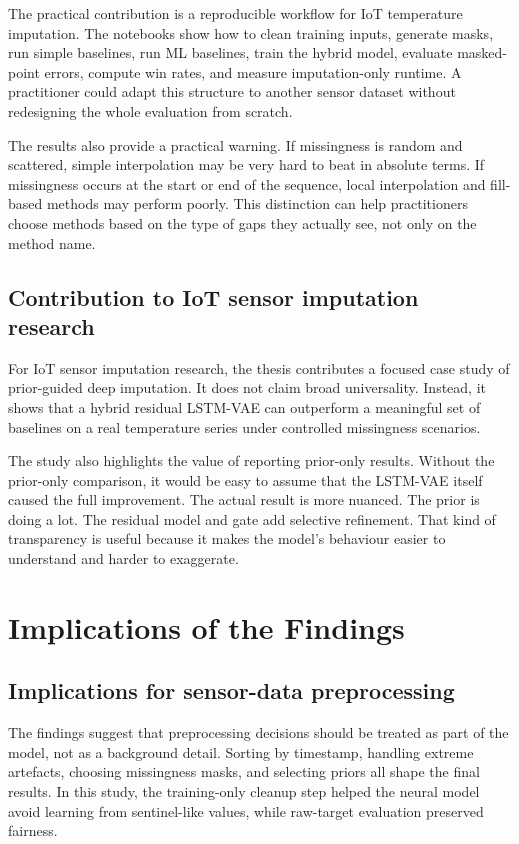 The practical contribution is a reproducible workflow for IoT temperature imputation. The notebooks show how to clean training inputs, generate masks, run simple baselines, run ML baselines, train the hybrid model, evaluate masked-point errors, compute win rates, and measure imputation-only runtime. A practitioner could adapt this structure to another sensor dataset without redesigning the whole evaluation from scratch.

The results also provide a practical warning. If missingness is random and scattered, simple interpolation may be very hard to beat in absolute terms. If missingness occurs at the start or end of the sequence, local interpolation and fill-based methods may perform poorly. This distinction can help practitioners choose methods based on the type of gaps they actually see, not only on the method name.

\subsection{Contribution to IoT sensor imputation research}

For IoT sensor imputation research, the thesis contributes a focused case study of prior-guided deep imputation. It does not claim broad universality. Instead, it shows that a hybrid residual LSTM-VAE can outperform a meaningful set of baselines on a real temperature series under controlled missingness scenarios.

The study also highlights the value of reporting prior-only results. Without the prior-only comparison, it would be easy to assume that the LSTM-VAE itself caused the full improvement. The actual result is more nuanced. The prior is doing a lot. The residual model and gate add selective refinement. That kind of transparency is useful because it makes the model's behaviour easier to understand and harder to exaggerate.

\section{Implications of the Findings}

\subsection{Implications for sensor-data preprocessing}

The findings suggest that preprocessing decisions should be treated as part of the model, not as a background detail. Sorting by timestamp, handling extreme artefacts, choosing missingness masks, and selecting priors all shape the final results. In this study, the training-only cleanup step helped the neural model avoid learning from sentinel-like values, while raw-target evaluation preserved fairness.

